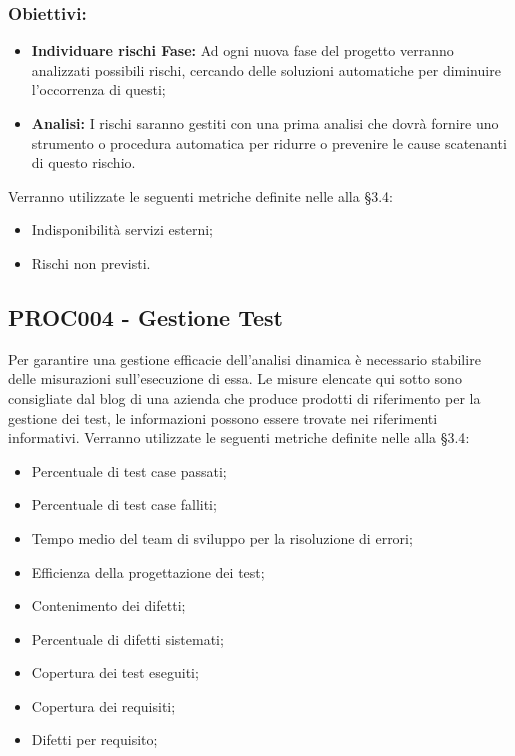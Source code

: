 \documentclass[PianoDiQualifica.tex]{subfiles}
\begin{document}
\subsubsection{Obiettivi:}
\begin{itemize}
	\item \textbf{Individuare rischi Fase:} Ad ogni nuova fase del progetto verranno analizzati possibili rischi, cercando delle soluzioni automatiche per diminuire l'occorrenza di questi;
	\item \textbf{Analisi:} I rischi saranno gestiti con una prima analisi che dovrà fornire uno strumento o procedura automatica per ridurre o prevenire le cause scatenanti di questo rischio.
\end{itemize}
Verranno utilizzate le seguenti metriche definite nelle \ndp alla \S{3.4}:
\begin{itemize}
	\item {} Indisponibilità servizi esterni;
	\item {} Rischi non previsti.
\end{itemize}

\subsection{PROC004 - Gestione Test}	
Per garantire una gestione efficacie dell'analisi dinamica è necessario stabilire delle misurazioni sull'esecuzione di essa.
Le misure elencate qui sotto sono consigliate dal blog di una azienda che produce prodotti di riferimento per la gestione dei test, le informazioni possono essere trovate nei riferimenti informativi.
Verranno utilizzate le seguenti metriche definite nelle \ndp alla \S{3.4}:
\begin{itemize}
	\item {} Percentuale di test case passati;
	\item {} Percentuale di test case falliti;
	\item {} Tempo medio del team di sviluppo per la risoluzione di errori;
	\item {} Efficienza della progettazione dei test;
	\item {} Contenimento dei difetti;
	\item {} Percentuale di difetti sistemati;
	\item {} Copertura dei test eseguiti;
	\item {} Copertura dei requisiti;
	\item {} Difetti per requisito;
	
\end{itemize}
\end{document}
